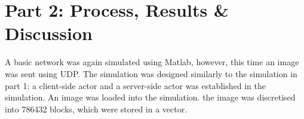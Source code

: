 \documentclass{article}
\begin{document}
\newpage

\section{Part 2: Process, Results \& Discussion}

A basic network was again simulated using Matlab, however, this time an image was sent using UDP. The simulation was designed similarly to the simulation in part 1: a client-side actor and a server-side actor was established in the simulation. An image was loaded into the simulation. the image was discretised into 786432 blocks, which were stored in a vector.
\end{document}
